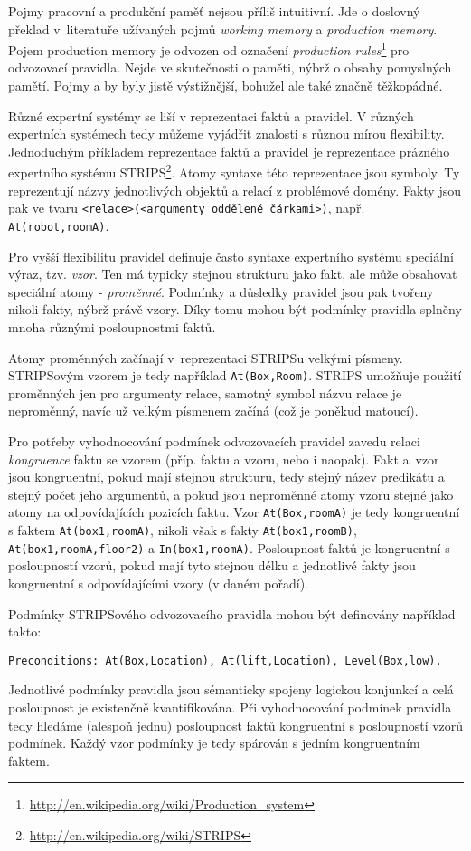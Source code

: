 Pojmy pracovní a produkční paměť nejsou příliš intuitivní. Jde o doslovný
překlad v~literatuře užívaných pojmů \emph{working memory} a \emph{production
memory}. Pojem production memory je odvozen od označení \emph{production
rules}\footnote{\url{http://en.wikipedia.org/wiki/Production\_system}} pro
odvozovací pravidla. Nejde ve skutečnosti o paměti, nýbrž o obsahy pomyslných
pamětí. Pojmy  a  by
byly jistě výstižnější, bohužel ale také značně těžkopádné.

Různé expertní systémy se liší v reprezentaci faktů a pravidel. V různých
expertních systémech tedy můžeme vyjádřit znalosti s různou mírou flexibility.
Jednoduchým příkladem reprezentace faktů a pravidel je reprezentace prázného
expertního systému STRIPS\footnote{\url{http://en.wikipedia.org/wiki/STRIPS}}.
Atomy syntaxe této reprezentace jsou symboly. Ty reprezentují názvy jednotlivých
objektů a relací z problémové domény. Fakty jsou pak ve tvaru
\verb|<relace>(<argumenty oddělené čárkami>)|, např. \verb|At(robot,roomA)|.

Pro vyšší flexibilitu pravidel definuje často syntaxe expertního systému
speciální výraz, tzv. \emph{vzor}. Ten má typicky stejnou strukturu jako fakt,
ale může obsahovat speciální atomy - \emph{proměnné}. Podmínky a důsledky
pravidel jsou pak tvořeny nikoli fakty, nýbrž právě vzory. Díky tomu mohou být
podmínky pravidla splněny mnoha různými posloupnostmi faktů.

Atomy proměnných začínají v~reprezentaci STRIPSu velkými písmeny. STRIPSovým
vzorem je tedy například \verb|At(Box,Room)|. STRIPS umožňuje použití proměnných
jen pro argumenty relace, samotný symbol názvu relace je neproměnný, navíc už
velkým písmenem začíná (což je poněkud matoucí).

Pro potřeby vyhodnocování podmínek odvozovacích pravidel zavedu relaci
\emph{kongruence} faktu se vzorem (příp. faktu a vzoru, nebo i naopak). Fakt
a~vzor jsou kongruentní, pokud mají stejnou strukturu, tedy stejný název
predikátu a stejný počet jeho argumentů, a pokud jsou neproměnné atomy vzoru
stejné jako atomy na odpovídajících pozicích faktu. Vzor \verb|At(Box,roomA)|
je tedy kongruentní s faktem \verb|At(box1,roomA)|, nikoli však s fakty
\verb|At(box1,roomB)|, \verb|At(box1,roomA,floor2)| a \verb|In(box1,roomA)|.
Posloupnost faktů je kongruentní s posloupností vzorů, pokud mají tyto stejnou
délku a jednotlivé fakty jsou kongruentní s odpovídajícími vzory (v daném
pořadí).

Podmínky STRIPSového odvozovacího pravidla mohou být definovány například takto:
\begin{verbatim}
Preconditions: At(Box,Location), At(lift,Location), Level(Box,low).
\end{verbatim}
Jednotlivé podmínky pravidla jsou sémanticky spojeny logickou konjunkcí a celá
posloupnost je existenčně kvantifikována. Při vyhodnocování podmínek pravidla
tedy hledáme (alespoň jednu) posloupnost faktů kongruentní s posloupností vzorů
podmínek. Každý vzor podmínky je tedy spárován s jedním kongruentním faktem.

